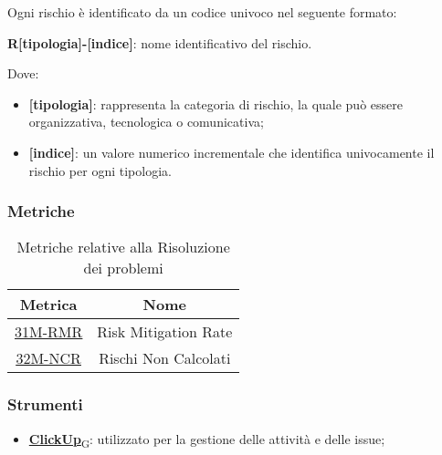 Ogni rischio è identificato da un codice univoco nel seguente formato:
\begin{center}
	\textbf{R[tipologia]-[indice]}: nome identificativo del rischio.
\end{center}
Dove:
\begin{itemize}
	\item \textbf{[tipologia]}: rappresenta la categoria di rischio, la quale può essere organizzativa, tecnologica o comunicativa;
	\item \textbf{[indice]}: un valore numerico incrementale che identifica univocamente il rischio per ogni tipologia.
\end{itemize}

\subsubsection{Metriche}
\begin{table}[h]
	\centering
	\begin{tabular}{|c|c|}
		\hline
		\textbf{Metrica} & \textbf{Nome}        						\\
		\hline
		\underline{\hyperlink{31M}{31M-RMR}}   &  Risk Mitigation Rate  \\
		\underline{\hyperlink{32M}{32M-NCR}}   &  Rischi Non Calcolati  \\
		\hline
	\end{tabular}
	\caption{Metriche relative alla Risoluzione dei problemi}
\end{table}

\subsubsection{Strumenti}
\begin{itemize}
	\item \href{https://7last.github.io/docs/rtb/documentazione-interna/glossario\#clickup}{\textbf{ClickUp}\textsubscript{G}}: utilizzato per la gestione delle attività e delle issue;
\end{itemize}
